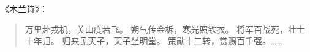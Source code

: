 \documentclass{ctexart}
\begin{document}
    《木兰诗》：
    \begin{quotation}
    万里赴戎机，关山度若飞。
    朔气传金柝，寒光照铁衣。
    将军百战死，壮士十年归。
    归来见天子，天子坐明堂。
    策勋十二转，赏赐百千强。……
    \end{quotation}
\end{document}

